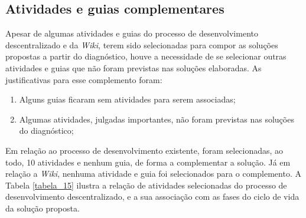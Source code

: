 \subsection{Atividades e guias complementares}

Apesar de algumas atividades e guias do processo de desenvolvimento descentralizado e da \textit{Wiki}, terem sido selecionadas para compor as soluções propostas a partir do diagnóstico, houve a necessidade de se selecionar outras atividades e guias que não foram previstas nas soluções elaboradas. As justificativas para esse complemento foram:

\begin{enumerate}
\item Alguns guias ficaram sem atividades para serem associadas;
\item Algumas atividades, julgadas importantes, não foram previstas nas soluções do diagnóstico;
\end{enumerate}

Em relação ao processo de desenvolvimento existente, foram selecionadas, ao todo, 10 atividades e nenhum guia, de forma a complementar a solução. Já em relação a \textit{Wiki}, nenhuma atividade e guia foi selecionados para o complemento. A Tabela \ref{tabela_15} ilustra a relação de atividades selecionadas do processo de desenvolvimento descentralizado, e a sua associação com as fases do ciclo de vida da solução proposta.

